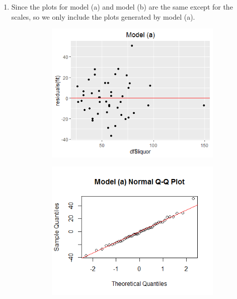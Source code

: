 \documentclass[11pt]{article}
\begin{document}
\begin{enumerate}
\item
Since the plots for model (a) and model (b) are the same except for the scales, so we only include the plots generated by model (a).

\begin{figure}[H]
  \centering
  \begin{subfigure}[h]{0.4\linewidth}
    \includegraphics[width=\linewidth]{Q4_8_1.png}
  \end{subfigure}
  \begin{subfigure}[h]{0.4\linewidth}
    \includegraphics[width=\linewidth]{Q4_8_2.png}
  \end{subfigure}
\end{figure}


\end{enumerate}
\end{document}
